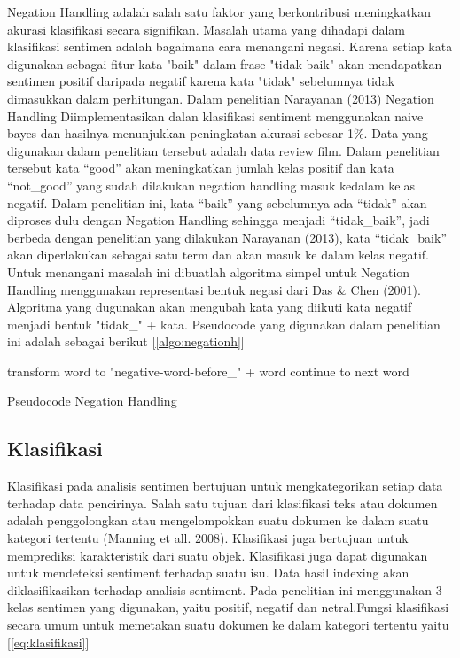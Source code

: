Negation Handling adalah salah satu faktor yang berkontribusi meningkatkan akurasi klasifikasi secara signifikan. Masalah utama yang dihadapi dalam klasifikasi sentimen adalah bagaimana cara menangani negasi. Karena setiap kata digunakan sebagai fitur kata "baik" dalam frase "tidak baik" akan mendapatkan sentimen positif daripada negatif karena kata "tidak" sebelumnya tidak dimasukkan dalam perhitungan.
\newline Dalam penelitian Narayanan (2013) Negation Handling Diimplementasikan dalan klasifikasi sentiment menggunakan naive bayes dan hasilnya menunjukkan peningkatan akurasi sebesar 1\%. Data yang digunakan dalam penelitian tersebut adalah data review film. Dalam penelitian tersebut kata “good” akan meningkatkan jumlah kelas positif dan kata “not\_good” yang sudah dilakukan negation handling masuk kedalam kelas negatif.
Dalam penelitian ini, kata “baik” yang sebelumnya ada “tidak” akan diproses dulu dengan Negation Handling sehingga menjadi “tidak\_baik”, jadi berbeda dengan penelitian yang dilakukan Narayanan (2013), kata “tidak\_baik” akan diperlakukan sebagai satu term dan akan masuk ke dalam kelas negatif.
\newline Untuk menangani masalah ini dibuatlah algoritma simpel untuk Negation Handling menggunakan representasi bentuk negasi dari Das \& Chen (2001). Algoritma yang dugunakan akan mengubah kata yang diikuti kata negatif menjadi bentuk "tidak\_" + kata. Pseudocode yang digunakan dalam penelitian ini adalah sebagai berikut [\ref{algo:negationh}]

\begin{algorithm}
	\DontPrintSemicolon %
	 {
		 {
			transform word to "negative-word-before\_" + word
		}
		 {
			continue to next word 
		}
	}
	
	\caption{Pseudocode Negation Handling}
	\label{algo:negationh}
\end{algorithm}

\subsection*{Klasifikasi}
Klasifikasi pada analisis sentimen bertujuan untuk mengkategorikan setiap data terhadap data pencirinya. Salah satu tujuan dari klasifikasi teks atau dokumen adalah penggolongkan atau mengelompokkan suatu dokumen ke dalam suatu kategori tertentu (Manning et all. 2008). Klasifikasi juga bertujuan untuk memprediksi karakteristik dari suatu objek. Klasifikasi juga dapat digunakan untuk mendeteksi sentiment terhadap suatu isu. Data hasil indexing akan diklasifikasikan terhadap analisis sentiment. Pada penelitian ini menggunakan 3 kelas sentimen yang digunakan, yaitu positif, negatif dan netral.Fungsi klasifikasi secara umum untuk memetakan suatu dokumen ke dalam kategori tertentu yaitu [\ref{eq:klasifikasi}]

